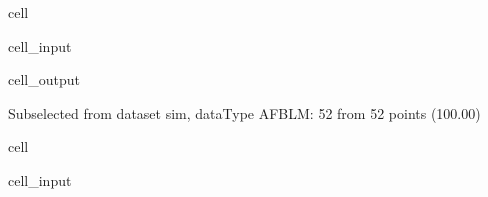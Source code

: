 \documentclass[letterpaper,table,10pt,english]{jupyterBook}
\begin{document}
\begin{sphinxuseclass}{cell}\begin{sphinxVerbatimInput}

\begin{sphinxuseclass}{cell_input}
\begin{sphinxVerbatim}[commandchars=\\\{\}]

   
   
\end{sphinxVerbatim}

\end{sphinxuseclass}\end{sphinxVerbatimInput}
\begin{sphinxVerbatimOutput}

\begin{sphinxuseclass}{cell_output}
\begin{sphinxVerbatim}[commandchars=\\\{\}]
Subselected from dataset \PYGZsq{}sim\PYGZsq{}, dataType \PYGZsq{}AFBLM\PYGZsq{}: 52 from 52 points (100.00\PYGZpc{})
\end{sphinxVerbatim}

\end{sphinxuseclass}\end{sphinxVerbatimOutput}

\end{sphinxuseclass}
\begin{sphinxuseclass}{cell}\begin{sphinxVerbatimInput}

\begin{sphinxuseclass}{cell_input}
\begin{sphinxVerbatim}[commandchars=\\\{\}]
  
\end{sphinxVerbatim}

\end{sphinxuseclass}\end{sphinxVerbatimInput}

\end{sphinxuseclass}
\end{document}
